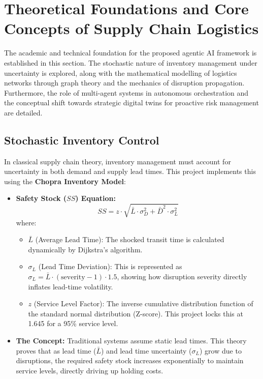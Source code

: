 \chapter{Theoretical Foundations and Core Concepts of Supply Chain Logistics}

The academic and technical foundation for the proposed agentic AI framework is established in this section. The stochastic nature of inventory management under uncertainty is explored, along with the mathematical modelling of logistics networks through graph theory and the mechanics of disruption propagation. Furthermore, the role of multi-agent systems in autonomous orchestration and the conceptual shift towards strategic digital twins for proactive risk management are detailed.

\section{Stochastic Inventory Control}
In classical supply chain theory, inventory management must account for uncertainty in both demand and supply lead times. This project implements this using the \textbf{Chopra Inventory Model}:

\begin{itemize}
    \item \textbf{Safety Stock ($SS$) Equation:}
    \begin{equation}
    SS = z \cdot \sqrt{\bar{L} \cdot \sigma_D^2 + \bar{D}^2 \cdot \sigma_L^2}
    \end{equation}
    where:
    \begin{itemize}
        \item $\bar{L}$ (Average Lead Time): The shocked transit time is calculated dynamically by Dijkstra's algorithm.
        \item $\sigma_L$ (Lead Time Deviation): This is represented as $\sigma_L = \bar{L} \cdot (\text{severity} - 1) \cdot 1.5$, showing how disruption severity directly inflates lead-time volatility.
        \item $z$ (Service Level Factor): The inverse cumulative distribution function of the standard normal distribution (Z-score). This project locks this at 1.645 for a 95\% service level.
    \end{itemize}
    \item \textbf{The Concept:} Traditional systems assume static lead times. This theory proves that as lead time ($\bar{L}$) and lead time uncertainty ($\sigma_L$) grow due to disruptions, the required safety stock increases exponentially to maintain service levels, directly driving up holding costs.
\end{itemize}

